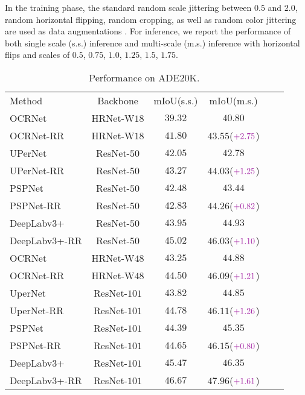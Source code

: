 \documentclass[final]{cvpr}
\begin{document}
In the training phase, the standard random scale jittering between $0.5$ and $2.0$, random horizontal flipping, random cropping, as well as random color jittering are used as data augmentations \cite{mmseg2020}. For inference, we report the performance of both single scale (s.s.) inference and multi-scale (m.s.) inference with horizontal flips and
scales of $0.5$, $0.75$, $1.0$, $1.25$, $1.5$, $1.75$.



\begin{table}[t]
	\centering
	\setlength{\tabcolsep}{2.0pt}
	\caption{Performance on ADE$20$K.}
	\resizebox{1.0\linewidth}{!}
	{
		\begin{tabular}{l|ccccc}
			\shline
			Method &Backbone  &$\mathrm{mIoU}$(s.s.) &$\mathrm{mIoU}$(m.s.) \\
			\shline
			OCRNet              &HRNet-W$18$   &$39.32$ &$40.80$ \\
			OCRNet-RR           &HRNet-W$18$   &$41.80$ &$43.55$($\textcolor{mylight}{+2.75}$) \\
			UPerNet             &ResNet-$50$  &$42.05$ &$42.78$ \\
			UPerNet-RR          &ResNet-$50$  &$43.27$ &$44.03$($\textcolor{mylight}{+1.25}$) \\
			PSPNet              &ResNet-$50$  &$42.48$ &$43.44$ \\ 
			PSPNet-RR           &ResNet-$50$  &$42.83$ &$44.26$($\textcolor{mylight}{+0.82}$) \\ 
			DeepLabv$3$+        &ResNet-$50$  &$43.95$ &$44.93$ \\
			DeepLabv$3$+-RR     &ResNet-$50$  &$45.02$ &$46.03$($\textcolor{mylight}{+1.10}$) \\
			\shline
			OCRNet              &HRNet-W$48$   &$43.25$ &$44.88$ \\
			OCRNet-RR           &HRNet-W$48$   &$44.50$ &$46.09$($\textcolor{mylight}{+1.21}$) \\
			UperNet             &ResNet-$101$ &$43.82$ &$44.85$ \\
			UperNet-RR          &ResNet-$101$ &$44.78$ &$46.11$($\textcolor{mylight}{+1.26}$) \\
			PSPNet              &ResNet-$101$ &$44.39$ &$45.35$ \\
			PSPNet-RR           &ResNet-$101$ &$44.65$ &$46.15$($\textcolor{mylight}{+0.80}$) \\
            DeepLabv$3$+        &ResNet-$101$ &$45.47$ &$46.35$ \\
			DeepLabv$3$+-RR     &ResNet-$101$ &$46.67$ &$47.96$($\textcolor{mylight}{+1.61}$) \\

\end{tabular}}
\end{table}
\end{document}
